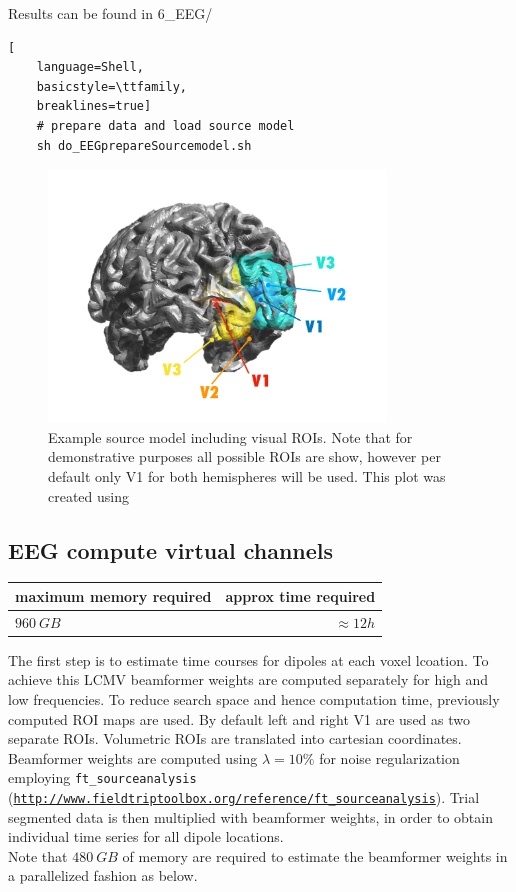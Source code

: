 \documentclass[12pt,a4paper]{scrartcl}
\begin{document}
\noindent Results can be found in 6\_EEG/\\
\begin{lstlisting}[
    language=Shell,
    basicstyle=\ttfamily,
    breaklines=true]
    # prepare data and load source model
    sh do_EEGprepareSourcemodel.sh
\end{lstlisting}
\begin{figure}
\begin{center}
\includegraphics[width=0.8\textwidth]{exampleSourcemodel}
\caption[Example source model]{Example source model including visual ROIs. Note that for demonstrative purposes all possible ROIs are show, however per default only V1 for both hemispheres will be used. This plot was created using \texttt{}}
\label{fig:exampleSourcemodel}
\end{center}
\end{figure}
\FloatBarrier
\subsection{EEG compute virtual channels}

\begin{table}[h]
\begin{tabular}{l | r}
\toprule
maximum memory required & approx time required\\\toprule
$960~GB$ & $\approx 12h$ \\\bottomrule
\end{tabular}
\end{table}
The first step is to estimate time courses for dipoles at each voxel lcoation. To achieve this LCMV beamformer weights are computed separately for high and low frequencies. To reduce search space and hence computation time, previously computed ROI maps are used. By default left and right V1 are used as two separate ROIs. Volumetric ROIs are translated into cartesian coordinates. Beamformer weights are computed using \texttt{$\lambda=10\%$} for noise regularization employing \texttt{ft\_sourceanalysis} (\href{http://www.fieldtriptoolbox.org/reference/ft\_sourceanalysis}{\nolinkurl{http://www.fieldtriptoolbox.org/reference/ft\_sourceanalysis}}). Trial segmented data is then multiplied with beamformer weights, in order to obtain individual time series for all dipole locations.\\
Note that $480~GB$ of memory are required to estimate the beamformer weights in a parallelized fashion as below.\\
\end{document}
